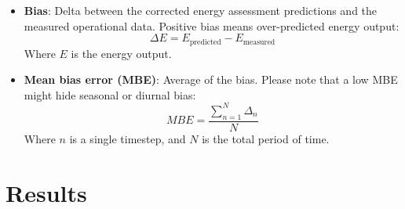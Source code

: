 \documentclass[conference]{IEEEtran}
\begin{document}
\begin{itemize}
\item \textbf{Bias}: Delta between the corrected energy assessment predictions and the measured operational data. Positive bias means over-predicted energy output:
\begin{equation}
\Delta E={E_\text{predicted}} - {E_\text{measured}}\label{eq:bias}
\end{equation}
Where $E$ is the energy output.
\item \textbf{Mean bias error (MBE)}: Average of the bias. Please note that a low MBE might hide seasonal or diurnal bias:
\begin{equation}
\mathit{MBE}=\frac{\sum_{n=1}^N{\Delta_n}}{N}\label{eq:mbe}
\end{equation}
Where $n$ is a single timestep, and $N$ is the total period of time. 



\end{itemize}


\section{Results}
\end{document}
